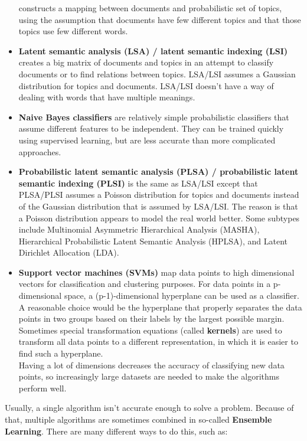 \begin{itemize}
		constructs a mapping between documents and probabilistic set of topics, using the assumption that documents have few different topics and that those topics use few different words.
	\item \textbf{Latent semantic analysis (LSA) / latent semantic indexing (LSI)}
		creates a big matrix of documents and topics in an attempt to classify documents or to find relations between topics. LSA/LSI assumes a Gaussian distribution for topics and documents. LSA/LSI doesn't have a way of dealing with words that have multiple meanings.
	\item \textbf{Naive Bayes classifiers}
		are relatively simple probabilistic classifiers that assume different features to be independent. They can be trained quickly using supervised learning, but are less accurate than more complicated approaches.
	\item \textbf{Probabilistic latent semantic analysis (PLSA) / probabilistic latent semantic indexing (PLSI)}
		is the same as LSA/LSI except that PLSA/PLSI assumes a Poisson distribution for topics and documents instead of the Gaussian distribution that is assumed by LSA/LSI. The reason is that a Poisson distribution appears to model the real world better. Some subtypes include Multinomial Asymmetric Hierarchical Analysis (MASHA), Hierarchical Probabilistic Latent Semantic Analysis (HPLSA), and Latent Dirichlet Allocation (LDA).
	\item \textbf{Support vector machines (SVMs)}
		map data points to high dimensional vectors for classification and clustering purposes. For data points in a p-dimensional space, a (p-1)-dimensional hyperplane can be used as a classifier. A reasonable choice would be the hyperplane that properly separates the data points in two groups based on their labels by the largest possible margin. Sometimes special transformation equations (called \textbf{kernels}) are used to transform all data points to a different representation, in which it is easier to find such a hyperplane.\\
		Having a lot of dimensions decreases the accuracy of classifying new data points, so increasingly large datasets are needed to make the algorithms perform well.
\end{itemize}

Usually, a single algorithm isn't accurate enough to solve a problem. Because of that, multiple algorithms are sometimes combined in so-called \textbf{Ensemble Learning}. There are many different ways to do this, such as:

